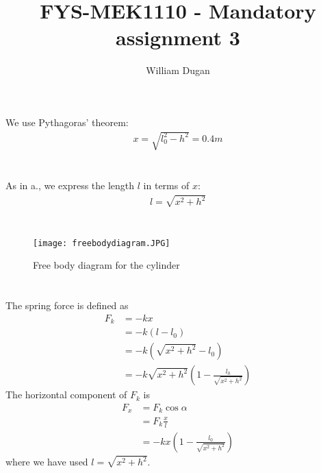 \documentclass[a4paper,10pt,english]{article}
\title{FYS-MEK1110 - Mandatory assignment 3}
\author{William Dugan}
\begin{document}
\maketitle

\section{}
We use Pythagoras' theorem:
\begin{align*}
    x = \sqrt{l_0^2-h^2} = 0.4m
\end{align*}

\section{}
As in a., we express the length $l$ in terms of $x$:
\begin{align*}
    l = \sqrt{x^2+h^2}
\end{align*}

\section{}
\begin{figure}[h]
    \centering
    \texttt{[image: freebodydiagram.JPG]}
    \caption{Free body diagram for the cylinder}
    \label{fig:fbd}
\end{figure}
 
\section{}
The spring force is defined as
\begin{align*}
    F_k
    &= -kx \\
    &= -k(l-l_0) \\
    &= -k(\sqrt{x^2+h^2}-l_0) \\
    &= -k \sqrt{x^2+h^2} 
        \left( 
            1 - \frac{l_0}{\sqrt{x^2+h^2}}
        \right)
\end{align*}
The horizontal component of $F_k$ is 
\begin{align*}
    F_x 
    &= F_k\cos\alpha \\
    &= F_k \frac{x}{l} \\
    &= -k x
        \left( 
            1 - \frac{l_0}{\sqrt{x^2+h^2}}
        \right)
\end{align*}
where we have used $l=\sqrt{x^2+h^2}$.

\section{}

\end{document}
